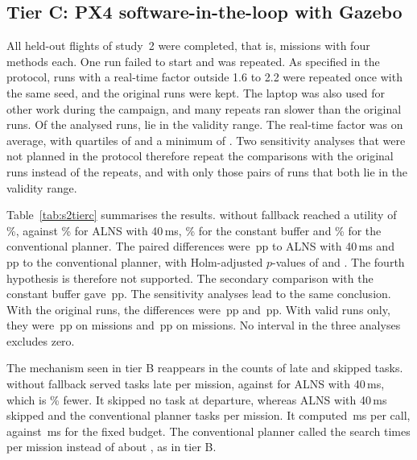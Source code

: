 \subsection{Tier C: PX4 software-in-the-loop with Gazebo}\label{sec:Ss2-tierc}
All  held-out flights of study~2 were completed, that is,  missions with four methods each. One run
failed to start and was repeated. As specified in the protocol,  runs with a real-time factor outside
1.6 to 2.2 were repeated once with the same seed, and the original runs were kept. The laptop was also used for other
work during the campaign, and many repeats ran slower than the original runs. Of the  analysed runs,
 lie in the validity range. The real-time factor was  on average, with quartiles of
 and a minimum of . Two sensitivity analyses that were not planned in the protocol therefore repeat the
comparisons with the original runs instead of the repeats, and with only those pairs of runs that both lie in the
validity range.

Table~\ref{tab:s2tierc} summarises the results. \mname{} without fallback reached a utility of \%, against
\% for ALNS with 40\,ms, \% for the constant buffer and \% for the conventional
planner. The paired differences were \,pp to ALNS with 40\,ms and \,pp to the conventional
planner, with Holm-adjusted $p$-values of  and . The fourth hypothesis is therefore not
supported. The secondary comparison with the constant buffer gave \,pp. The sensitivity analyses lead to
the same conclusion. With the original runs, the differences were \,pp and \,pp.
With valid runs only, they were \,pp on  missions and \,pp on
 missions. No interval in the three analyses excludes zero.


The mechanism seen in tier B reappears in the counts of late and skipped tasks. \mname{} without fallback served
 tasks late per mission, against  for ALNS with 40\,ms, which is \%
fewer. It skipped no task at departure, whereas ALNS with 40\,ms skipped  and the conventional planner
 tasks per mission. It computed \,ms per call, against \,ms for the fixed
budget. The conventional planner called the search  times per mission instead of about
, as in tier B.


